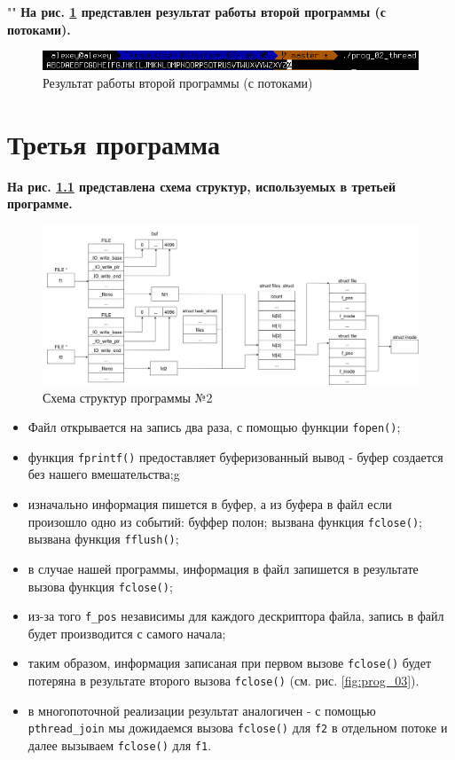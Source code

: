 \documentclass[12pt]{report}
\begin{document}
""\newline
\textbf{На рис. \ref{fig:prog_02_thread} представлен результат работы второй программы (с потоками).}

\begin{figure}[H]
	\centering
	\includegraphics[scale=0.8]{img/prog_02_thread.png}
	\caption{Результат работы второй программы (с потоками)}
	\label{fig:prog_02_thread}
\end{figure}

\chapter{Третья программа}

\textbf{На рис. \ref{fig:prog_03_schema} представлена схема структур, используемых в третьей программе.}

\begin{figure}[H]
	\centering
	\includegraphics[scale=0.32]{img/prog_03_schema.jpg}
	\caption{Схема структур программы №2}
	\label{fig:prog_03_schema}
\end{figure}

\begin{itemize}
	\item Файл открывается на запись два раза, с помощью функции \texttt{fopen()};
	\item функция \texttt{fprintf()} предоставляет буферизованный вывод - буфер создается без нашего вмешательства;g
	\item изначально информация пишется в буфер, а из буфера в файл если произошло одно из событий:
		\subitem буффер полон;
		\subitem вызвана функция \texttt{fclose()};
		\subitem вызвана функция \texttt{fflush()};
	\item в случае нашей программы, информация в файл запишется в результате вызова функция \texttt{fclose()};
	\item из-за того \texttt{f\_pos} независимы для каждого дескриптора файла, запись в файл будет производится с самого начала;
	\item таким образом, информация записаная при первом вызове \texttt{fclose()} будет потеряна в результате второго вызова \texttt{fclose()} (см. рис. \ref{fig:prog_03}).
	\item в многопоточной реализации результат аналогичен - с помощью \texttt{pthread\_join} мы дожидаемся вызова \texttt{fclose()} для \texttt{f2} в отдельном потоке и далее вызываем \texttt{fclose()} для \texttt{f1}.
\end{itemize}
\end{document}
